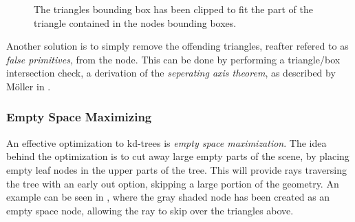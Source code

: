 \begin{figure}
  \centering

  \vspace{3mm}
  \parbox{5cm}{ \caption[Triangle clipping.]{The triangles bounding
      box has been clipped to fit the part of the triangle contained
      in the nodes bounding boxes.}\label{fig:aabbClipped}}
\end{figure}

Another solution is to simply remove the offending triangles, reafter
refered to as \textit{false primitives}, from the node. This can be
done by performing a triangle/box intersection check, a derivation of
the \textit{seperating axis theorem}, as described by Möller in
.


\subsubsection{Empty Space Maximizing}\label{sec:emptySpace}

An effective optimization to kd-trees is \textit{empty space
  maximization}. The idea behind the optimization is to cut away large
empty parts of the scene, by placing empty leaf nodes in the upper
parts of the tree. This will provide rays traversing the tree with an
early out option, skipping a large portion of the geometry. An example
can be seen in , where the gray shaded
node has been created as an empty space node, allowing the ray to skip
over the triangles above.

